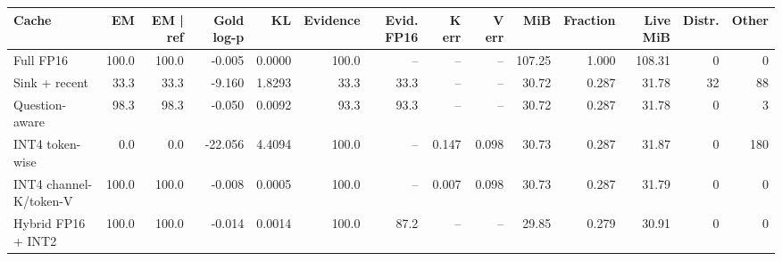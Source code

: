 \scriptsize
\setlength{\tabcolsep}{3.5pt}
\label{tab:t2cfid}
\begin{adjustbox}{max width=\linewidth}
\begin{tabular}{lrrrrrrrrrrrrr}
\toprule
Cache & EM & EM | ref & Gold log-p & KL & Evidence & Evid. FP16 & K err & V err & MiB & Fraction & Live MiB & Distr. & Other \\
\midrule
Full FP16 & 100.0 & 100.0 & -0.005 & 0.0000 & 100.0 & -- & -- & -- & 107.25 & 1.000 & 108.31 & 0 & 0 \\
Sink + recent & 33.3 & 33.3 & -9.160 & 1.8293 & 33.3 & 33.3 & -- & -- & 30.72 & 0.287 & 31.78 & 32 & 88 \\
Question-aware & 98.3 & 98.3 & -0.050 & 0.0092 & 93.3 & 93.3 & -- & -- & 30.72 & 0.287 & 31.78 & 0 & 3 \\
INT4 token-wise & 0.0 & 0.0 & -22.056 & 4.4094 & 100.0 & -- & 0.147 & 0.098 & 30.73 & 0.287 & 31.87 & 0 & 180 \\
INT4 channel-K/token-V & 100.0 & 100.0 & -0.008 & 0.0005 & 100.0 & -- & 0.007 & 0.098 & 30.73 & 0.287 & 31.79 & 0 & 0 \\
Hybrid FP16 + INT2 & 100.0 & 100.0 & -0.014 & 0.0014 & 100.0 & 87.2 & -- & -- & 29.85 & 0.279 & 30.91 & 0 & 0 \\
\bottomrule
\end{tabular}
\end{adjustbox}
